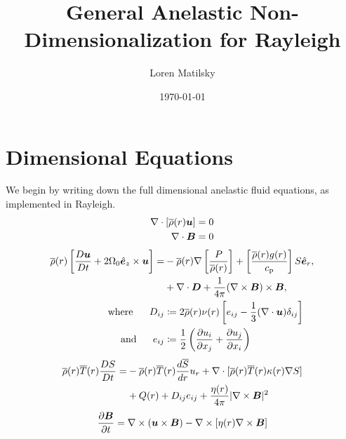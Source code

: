 \documentclass[12pt]{article}
\date{\today}
\author{Loren Matilsky}
\title{General Anelastic Non-Dimensionalization for Rayleigh}
\numberwithin{equation}{section}
\begin{document}
	\maketitle
	\section{Dimensional Equations}
	We begin by writing down the full dimensional anelastic fluid equations, as implemented in Rayleigh.
	\begin{align}
		\nabla\cdot[\overline{\rho}(r)\bm{u}] &= 0\label{eq:contdim}\\
		\nabla\cdot \bm{B} &= 0
	\end{align}
	\begin{subequations}\label{eq:momdim}
	\begin{align}
		\overline{\rho}(r)\left[\frac{D\bm{u}}{Dt}+2\Omega_0\hat{\bm{e}}_z\times\bm{u}\right] = &-\overline{\rho}(r)\nabla\left[ \frac{P}{\overline{\rho}(r)} \right] + \left[\frac{\overline{\rho}(r) g(r)}{c_{\rm{p}}}\right] S\hat{\bm{e}}_r, \nonumber\\
		&+\nabla\cdot\bm{D} + \frac{1}{4\pi}(\nabla\times\bm{B})\times\bm{B},\\
		\text{where}\ \ \ \ \  D_{ij} &\coloneqq 2\overline{\rho}(r)\nu(r) \left[e_{ij} - \frac{1}{3}(\nabla\cdot\bm{u}) \delta_{ij} \right]\\
		\text{and}\ \ \ \ \  e_{ij} &\coloneqq \frac{1}{2}\left(\frac{\partial u_i}{\partial x_j} + \frac{\partial u_j}{\partial x_i} \right)
	\end{align}
	\end{subequations}
	\begin{align}\label{eq:endim}
		\overline{\rho}(r)\overline{T}(r) \frac{DS}{Dt} = &- \overline{\rho}(r)\overline{T}(r) \frac{d\overline{S}}{dr} u_r + \nabla\cdot[\overline{\rho}(r) \overline{T}(r) \kappa(r) \nabla S] \nonumber \\
		&+ Q(r) + D_{ij}e_{ij} + \frac{\eta(r)}{4\pi}|\nabla\times\bm{B}|^2
	\end{align}
	\begin{align}\label{eq:inddim}
	\frac{\partial\bm{B}}{\partial t} = \nabla\times(\bm{u}\times\bm{B}) - \nabla\times[\eta(r)\nabla\times\bm{B}]
	\end{align}
\end{document}
